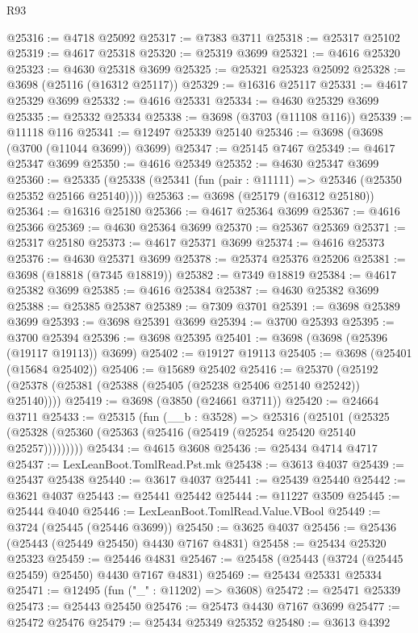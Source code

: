 \begin{lexlean}{R93}
\begin{coremodule}
@25316 := @4718 @25092
@25317 := @7383 @3711
@25318 := @25317 @25102
@25319 := @4617 @25318
@25320 := @25319 @3699
@25321 := @4616 @25320
@25323 := @4630 @25318 @3699
@25325 := @25321 @25323 @25092
@25328 := @3698 (@25116 (@16312 @25117))
@25329 := @16316 @25117
@25331 := @4617 @25329 @3699
@25332 := @4616 @25331
@25334 := @4630 @25329 @3699
@25335 := @25332 @25334
@25338 := @3698 (@3703 (@11108 @116))
@25339 := @11118 @116
@25341 := @12497 @25339 @25140
@25346 := @3698 (@3698 (@3700 (@11044 @3699)) @3699)
@25347 := @25145 @7467
@25349 := @4617 @25347 @3699
@25350 := @4616 @25349
@25352 := @4630 @25347 @3699
@25360 := @25335 (@25338 (@25341 (fun (pair : @11111) => @25346 (@25350 @25352 @25166 @25140))))
@25363 := @3698 (@25179 (@16312 @25180))
@25364 := @16316 @25180
@25366 := @4617 @25364 @3699
@25367 := @4616 @25366
@25369 := @4630 @25364 @3699
@25370 := @25367 @25369
@25371 := @25317 @25180
@25373 := @4617 @25371 @3699
@25374 := @4616 @25373
@25376 := @4630 @25371 @3699
@25378 := @25374 @25376 @25206
@25381 := @3698 (@18818 (@7345 @18819))
@25382 := @7349 @18819
@25384 := @4617 @25382 @3699
@25385 := @4616 @25384
@25387 := @4630 @25382 @3699
@25388 := @25385 @25387
@25389 := @7309 @3701
@25391 := @3698 @25389 @3699
@25393 := @3698 @25391 @3699
@25394 := @3700 @25393
@25395 := @3700 @25394
@25396 := @3698 @25395
@25401 := @3698 (@3698 (@25396 (@19117 @19113)) @3699)
@25402 := @19127 @19113
@25405 := @3698 (@25401 (@15684 @25402))
@25406 := @15689 @25402
@25416 := @25370 (@25192 (@25378 (@25381 (@25388 (@25405 (@25238 @25406 @25140 @25242)) @25140))))
@25419 := @3698 (@3850 (@24661 @3711))
@25420 := @24664 @3711
@25433 := @25315
    (fun (__b : @3528) =>
    @25316
      (@25101 (@25325 (@25328 (@25360 (@25363 (@25416 (@25419 (@25254 @25420 @25140 @25257)))))))))
@25434 := @4615 @3608
@25436 := @25434 @4714 @4717
@25437 := LexLeanBoot.TomlRead.Pst.mk
@25438 := @3613 @4037
@25439 := @25437 @25438
@25440 := @3617 @4037
@25441 := @25439 @25440
@25442 := @3621 @4037
@25443 := @25441 @25442
@25444 := @11227 @3509
@25445 := @25444 @4040
@25446 := LexLeanBoot.TomlRead.Value.VBool
@25449 := @3724 (@25445 (@25446 @3699))
@25450 := @3625 @4037
@25456 := @25436 (@25443 (@25449 @25450) @4430 @7167 @4831)
@25458 := @25434 @25320 @25323
@25459 := @25446 @4831
@25467 := @25458 (@25443 (@3724 (@25445 @25459) @25450) @4430 @7167 @4831)
@25469 := @25434 @25331 @25334
@25471 := @12495 (fun ("_" : @11202) => @3608)
@25472 := @25471 @25339
@25473 := @25443 @25450
@25476 := @25473 @4430 @7167 @3699
@25477 := @25472 @25476
@25479 := @25434 @25349 @25352
@25480 := @3613 @4392

\end{coremodule}
\end{lexlean}
